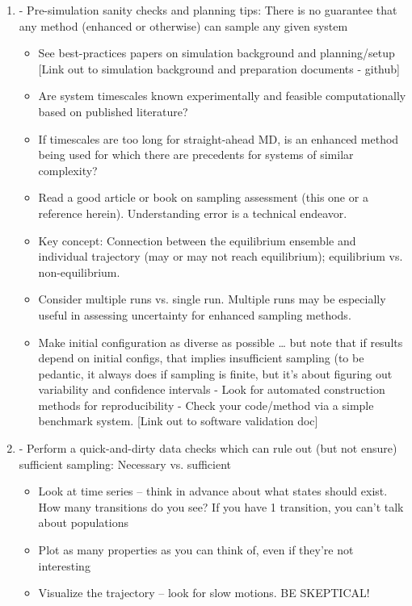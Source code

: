 \documentclass[9pt]{livecoms}
\begin{document}
\begin{enumerate}
\item
- Pre-simulation sanity checks and planning tips: There is no guarantee that any method (enhanced or otherwise) can sample any given system
    \begin{itemize}
    \item See best-practices papers on simulation background and planning/setup [Link out to simulation background and preparation documents - github]
    \item Are system timescales known experimentally and feasible computationally based on published literature?
    \item If timescales are too long for straight-ahead MD, is an enhanced method being used for which there are precedents for systems of similar complexity?
    \item Read a good article or book on sampling assessment (this one or a reference herein).  Understanding error is a technical endeavor.
    \item Key concept: Connection between the equilibrium ensemble and individual trajectory (may or may not reach equilibrium); equilibrium vs. non-equilibrium.
    \item Consider multiple runs vs. single run.  Multiple runs may be especially useful in assessing uncertainty for enhanced sampling methods.
    \item Make initial configuration as diverse as possible  … but note that if results depend on initial configs, that implies insufficient sampling (to be pedantic, it always does if sampling is finite, but it’s about figuring out variability and confidence intervals
    - Look for automated construction methods for reproducibility
    - Check your code/method via a simple benchmark system.  [Link out to software validation doc]
    \end{itemize}
\item
- Perform a quick-and-dirty data checks which can rule out (but not ensure) sufficient sampling: Necessary vs. sufficient
    \begin{itemize}
    \item Look at time series -- think in advance about what states should exist. How many transitions do you see? If you have 1 transition, you can’t talk about populations
    \item Plot as many properties as you can think of, even if they’re not interesting
    \item Visualize the trajectory -- look for slow motions.  BE SKEPTICAL!

\end{itemize}
\end{enumerate}
\end{document}
